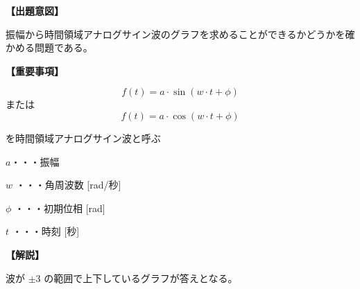\noindent \textbf{【出題意図】}

\noindent 振幅から時間領域アナログサイン波のグラフを求めることができるかどうかを確かめる問題である。

\vspace{1em}
\noindent \textbf{【重要事項】}

\[
f(t) = a \cdot \sin( w \cdot t + \phi )
\]
%
\noindent または
%
\[
f(t) = a \cdot \cos( w \cdot t + \phi )
\]

\medskip
\noindent を時間領域アナログサイン波と呼ぶ

\bigskip
\noindent $a$・・・振幅

\bigskip
\noindent $w$ ・・・角周波数 [rad/秒]

\bigskip
\noindent $\phi$ ・・・初期位相 [rad]

\bigskip
\noindent $t$ ・・・時刻 [秒]

\vspace{1em}
\noindent \textbf{【解説】}

\noindent 波が $\pm 3$ の範囲で上下しているグラフが答えとなる。

